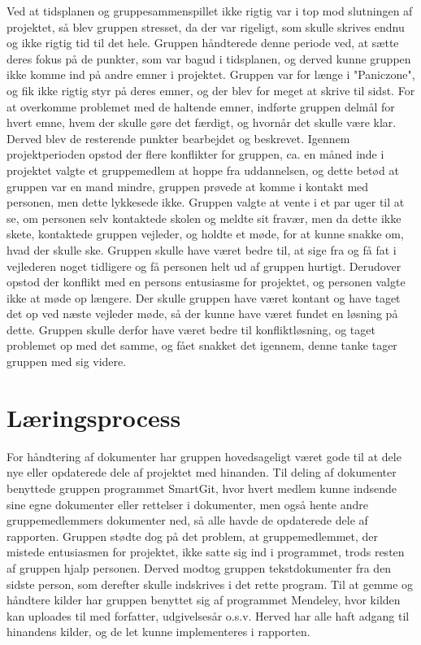 Ved at tidsplanen og gruppesammenspillet ikke rigtig var i top mod slutningen af projektet, så blev gruppen stresset, da der var rigeligt, som skulle skrives endnu og ikke rigtig tid til det hele. Gruppen håndterede denne periode ved, at sætte deres fokus på de punkter, som var bagud i tidsplanen, og derved kunne gruppen ikke komme ind på andre emner i projektet. Gruppen var for længe i "Paniczone", og fik ikke rigtig styr på deres emner, og der blev for meget at skrive til sidst. For at overkomme problemet med de haltende emner, indførte gruppen delmål for hvert emne, hvem der skulle gøre det færdigt, og hvornår det skulle være klar. Derved blev de resterende punkter bearbejdet og beskrevet. Igennem projektperioden opstod der flere konflikter for gruppen, ca. en måned inde i projektet valgte et gruppemedlem at hoppe fra uddannelsen, og dette betød at gruppen var en mand mindre, gruppen prøvede at komme i kontakt med personen, men dette lykkesede ikke. Gruppen valgte at vente i et par uger til at se, om personen selv kontaktede skolen og meldte sit fravær, men da dette ikke skete, kontaktede gruppen vejleder, og holdte et møde, for at kunne snakke om, hvad der skulle ske. Gruppen skulle have været bedre til, at sige fra og få fat i vejlederen noget tidligere og få personen helt ud af gruppen hurtigt. Derudover opstod der konflikt med en persons entusiasme for projektet, og personen valgte ikke at møde op længere. Der skulle gruppen have været kontant og have taget det op ved næste vejleder møde, så der kunne have været fundet en løsning på dette. Gruppen skulle derfor have været bedre til konfliktløsning, og taget problemet op med det samme, og fået snakket det igennem, denne tanke tager gruppen med sig videre. 

\section{Læringsprocess}

For håndtering af dokumenter har gruppen hovedsageligt været gode til at dele nye eller opdaterede dele af projektet med hinanden. Til deling af dokumenter benyttede gruppen programmet SmartGit, hvor hvert medlem kunne indsende sine egne dokumenter eller rettelser i dokumenter, men også hente andre gruppemedlemmers dokumenter ned, så alle havde de opdaterede dele af rapporten. Gruppen stødte dog på det problem, at gruppemedlemmet, der mistede entusiasmen for projektet, ikke satte sig ind i programmet, trods resten af gruppen hjalp personen. Derved modtog gruppen tekstdokumenter fra den sidste person, som derefter skulle indskrives i det rette program. Til at gemme og håndtere kilder har gruppen benyttet sig af programmet Mendeley, hvor kilden kan uploades til med forfatter, udgivelsesår o.s.v. Herved har alle haft adgang til hinandens kilder, og de let kunne implementeres i rapporten.

